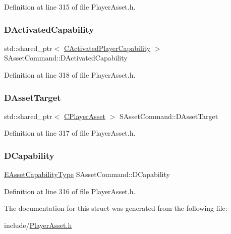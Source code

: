Definition at line 315 of file Player\+Asset.\+h.

\hypertarget{structSAssetCommand_ad8beda19520811cc70fe1eab16c774dd}{}\label{structSAssetCommand_ad8beda19520811cc70fe1eab16c774dd} 
\subsubsection{\texorpdfstring{D\+Activated\+Capability}{DActivatedCapability}}
{\footnotesize\ttfamily std\+::shared\+\_\+ptr$<$ \hyperlink{classCActivatedPlayerCapability}{C\+Activated\+Player\+Capability} $>$ S\+Asset\+Command\+::\+D\+Activated\+Capability}



Definition at line 318 of file Player\+Asset.\+h.

\hypertarget{structSAssetCommand_a3d9b43f6e59c386c48c41a65448a0c39}{}\label{structSAssetCommand_a3d9b43f6e59c386c48c41a65448a0c39} 
\subsubsection{\texorpdfstring{D\+Asset\+Target}{DAssetTarget}}
{\footnotesize\ttfamily std\+::shared\+\_\+ptr$<$ \hyperlink{classCPlayerAsset}{C\+Player\+Asset} $>$ S\+Asset\+Command\+::\+D\+Asset\+Target}



Definition at line 317 of file Player\+Asset.\+h.

\hypertarget{structSAssetCommand_a734ea7c6847457b437360f333f570ff9}{}\label{structSAssetCommand_a734ea7c6847457b437360f333f570ff9} 
\subsubsection{\texorpdfstring{D\+Capability}{DCapability}}
{\footnotesize\ttfamily \hyperlink{GameDataTypes_8h_a35b98ce26aca678b03c6f9f76e4778ce}{E\+Asset\+Capability\+Type} S\+Asset\+Command\+::\+D\+Capability}



Definition at line 316 of file Player\+Asset.\+h.



The documentation for this struct was generated from the following file\+:\begin{DoxyCompactItemize}
\item 
include/\hyperlink{PlayerAsset_8h}{Player\+Asset.\+h}\end{DoxyCompactItemize}
